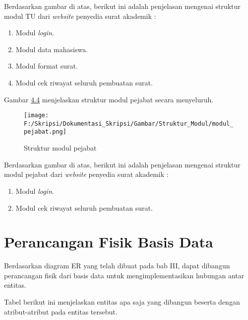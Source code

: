 Berdasarkan gambar di atas, berikut ini adalah penjelasan mengenai struktur modul TU dari \textit{\textit{website}} penyedia surat akademik :
\begin{enumerate}
	\item Modul \textit{login}.
	\item Modul data mahasiswa.
	\item Modul format surat.
	\item Modul cek riwayat seluruh pembuatan surat.
\end{enumerate}

Gambar \hyperlink{struktur_modul_pejabat}{4.4} menjelaskan struktur modul pejabat secara menyeluruh.

\begin{figure}[H]
	\centering
		\texttt{[image: F:/Skripsi/Dokumentasi\_Skripsi/Gambar/Struktur\_Modul/modul\_pejabat.png]}
	\caption{Struktur modul pejabat}
	\label{fig:struktur_modul_pejabat}
\end{figure}

Berdasarkan gambar di atas, berikut ini adalah penjelasan mengenai struktur modul pejabat dari \textit{\textit{website}} penyedia surat akademik :
\begin{enumerate}
	\item Modul \textit{login}.
	\item Modul cek riwayat seluruh pembuatan surat.
\end{enumerate}

\section{Perancangan Fisik Basis Data}
\label{sec:perancangan_fisik_basis_data}
Berdasarkan diagram ER yang telah dibuat pada bab III, dapat dibangun perancangan fisik dari basis data untuk mengimplementasikan hubungan antar entitas.\

Tabel berikut ini menjelaskan entitas apa saja yang dibangun beserta dengan atribut-atribut pada entitas tersebut.

